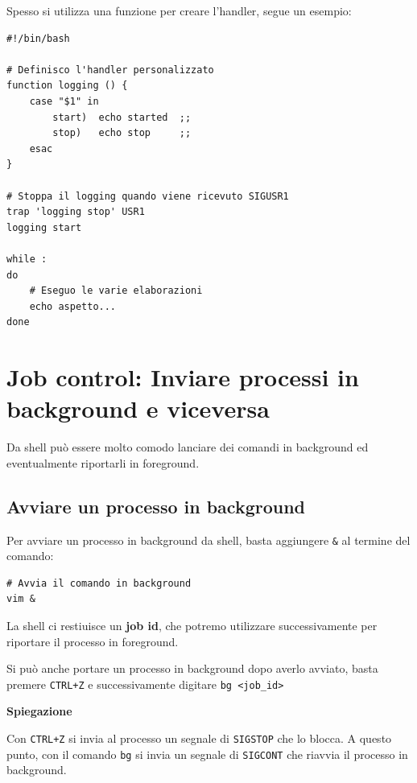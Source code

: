 \documentclass[a4paper]{report}
\newenvironment{info}{\begin{tcolorbox}[fonttitle=\sffamily\bfseries\large,title=Info,colframe=blue!75!white]}{\end{tcolorbox}}
\newenvironment{code}{\begin{tcolorbox}[size=small]}{\end{tcolorbox}}
\begin{document}
Spesso si utilizza una funzione per creare l'handler, segue un esempio:
\begin{code} 
\begin{lstlisting}
#!/bin/bash

# Definisco l'handler personalizzato
function logging () {
	case "$1" in
		start)	echo started  ;;
		stop)	echo stop	  ;;
	esac
}

# Stoppa il logging quando viene ricevuto SIGUSR1
trap 'logging stop' USR1
logging start

while :
do
	# Eseguo le varie elaborazioni
	echo aspetto...
done
\end{lstlisting}
\end{code}



\section{Job control: Inviare processi in background e viceversa}

Da shell può essere molto comodo lanciare dei comandi in background ed eventualmente riportarli in foreground.

\subsection{Avviare un processo in background}

Per avviare un processo in background da shell, basta aggiungere \texttt{\&} al termine del comando:

\begin{code} 
\begin{lstlisting}
# Avvia il comando in background
vim &
\end{lstlisting}
\end{code}

La shell ci restiuisce un \textbf{job id}, che potremo utilizzare successivamente per riportare il processo in foreground.

\begin{info}
	Si può anche portare un processo in background dopo averlo avviato, basta premere \texttt{CTRL+Z} e successivamente digitare \texttt{bg <job\_id>}
	
	\vspace{2mm}
	\textbf{Spiegazione}
	
	Con \texttt{CTRL+Z} si invia al processo un segnale di \texttt{SIGSTOP} che lo blocca. A questo punto, con il comando \texttt{bg} si invia un segnale di \texttt{SIGCONT} che riavvia il processo in background.	
\end{info}
\end{document}
